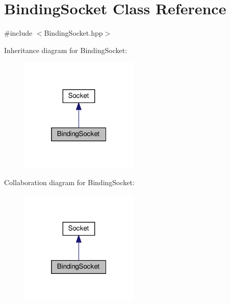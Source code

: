 \hypertarget{classBindingSocket}{}\section{Binding\+Socket Class Reference}
\label{classBindingSocket}


{\ttfamily \#include $<$Binding\+Socket.\+hpp$>$}



Inheritance diagram for Binding\+Socket\+:\nopagebreak
\begin{figure}[H]
\begin{center}
\leavevmode
\includegraphics[width=160pt]{classBindingSocket__inherit__graph}
\end{center}
\end{figure}


Collaboration diagram for Binding\+Socket\+:\nopagebreak
\begin{figure}[H]
\begin{center}
\leavevmode
\includegraphics[width=160pt]{classBindingSocket__coll__graph}
\end{center}
\end{figure}
